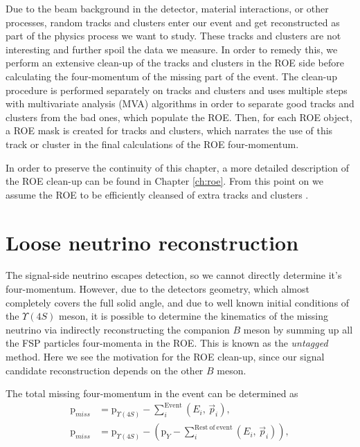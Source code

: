 \documentclass[oneside,a4paper,openany,12pt]{scrbook}
\begin{document}
Due to the beam background in the detector, material interactions, or other processes, random tracks and clusters enter our event and get reconstructed as part of the physics process we want to study. These tracks and clusters are not interesting and further spoil the data we measure. In order to remedy this, we perform an extensive clean-up of the tracks and clusters in the ROE side before calculating the four-momentum of the missing part of the event. The clean-up procedure is performed separately on tracks and clusters and uses multiple steps with multivariate analysis (MVA) algorithms in order to separate good tracks and clusters from the bad ones, which populate the ROE. Then, for each ROE object, a ROE mask is created for tracks and clusters, which narrates the use of this track or cluster in the final calculations of the ROE four-momentum.

In order to preserve the continuity of this chapter, a more detailed description of the ROE clean-up can be found in Chapter \ref{ch:roe}. From this point on we assume the ROE to be efficiently cleansed of extra tracks and clusters .

\section{Loose neutrino reconstruction}

The signal-side neutrino escapes detection, so we cannot directly determine it's four-momentum. However, due to the detectors geometry, which almost completely covers the full solid angle, and due to well known initial conditions of the $\Upsilon(4S)$ meson, it is possible to determine the kinematics of the missing neutrino via indirectly reconstructing the companion $B$ meson by summing up all the FSP particles four-momenta in the ROE. This is known as the \textit{untagged} method. Here we see the motivation for the ROE clean-up, since our signal candidate reconstruction depends on the other $B$ meson.

The total missing four-momentum in the event can be determined as
\begin{align}
\mathrm{p}_{miss} &= \mathrm{p}_{\Upsilon(4S)} - \sum_i^{\mathrm{Event}}\left(E_i,\,\vec{p}_i \right),\\
\label{eq:ROEloop}
\mathrm{p}_{miss} &= \mathrm{p}_{\Upsilon(4S)} - \left(\mathrm{p}_{Y} -\sum_i^{\mathrm{Rest~of~event}}\left(E_i,\,\vec{p}_i \right)\right),
\end{align}
\end{document}
